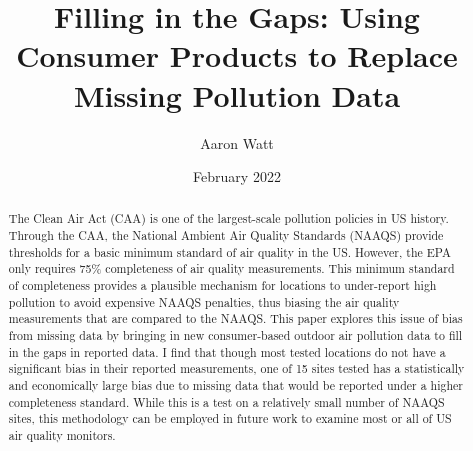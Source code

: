 \documentclass[12pt]{article}
\title{Filling in the Gaps: Using Consumer Products to Replace Missing Pollution Data}
\author{Aaron Watt}
\date{February 2022}
\begin{document}
\maketitle

\begin{abstract}


The Clean Air Act (CAA) is one of the largest-scale pollution policies in US history. Through the CAA, the National Ambient Air Quality Standards (NAAQS) provide thresholds for a basic minimum standard of air quality in the US. However, the EPA only requires 75\% completeness of air quality measurements. This minimum standard of completeness provides a plausible mechanism for locations to under-report high pollution to avoid expensive NAAQS penalties, thus biasing the air quality measurements that are compared to the NAAQS. This paper explores this issue of bias from missing data by bringing in new consumer-based outdoor air pollution data to fill in the gaps in reported data. I find that though most tested locations do not have a significant bias in their reported measurements, one of 15 sites tested has a statistically and economically large bias due to missing data that would be reported under a higher completeness standard. While this is a test on a relatively small number of NAAQS sites, this methodology can be employed in future work to examine most or all of US air quality monitors.







\vspace{2em}
\end{abstract}
\end{document}
